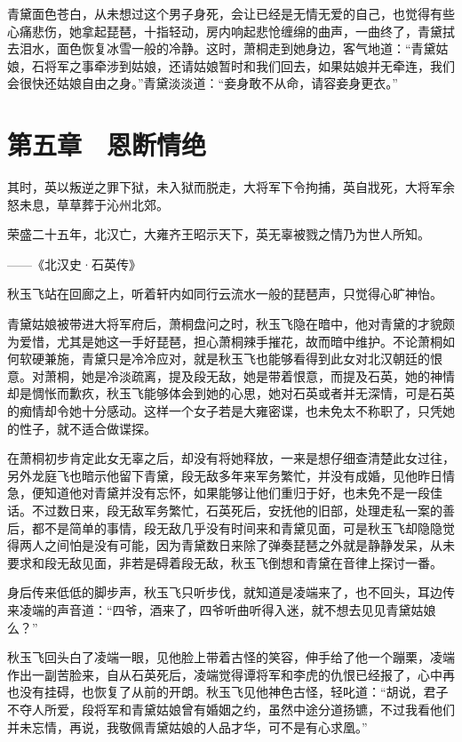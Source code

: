 青黛面色苍白，从未想过这个男子身死，会让已经是无情无爱的自己，也觉得有些心痛悲伤，她拿起琵琶，十指轻动，房内响起悲怆缠绵的曲声，一曲终了，青黛拭去泪水，面色恢复冰雪一般的冷静。这时，萧桐走到她身边，客气地道：“青黛姑娘，石将军之事牵涉到姑娘，还请姑娘暂时和我们回去，如果姑娘并无牵连，我们会很快还姑娘自由之身。”青黛淡淡道：“妾身敢不从命，请容妾身更衣。”

\chapter{第五章　恩断情绝}

其时，英以叛逆之罪下狱，未入狱而脱走，大将军下令拘捕，英自戕死，大将军余怒未息，草草葬于沁州北郊。

荣盛二十五年，北汉亡，大雍齐王昭示天下，英无辜被戮之情乃为世人所知。

——《北汉史·石英传》

秋玉飞站在回廊之上，听着轩内如同行云流水一般的琵琶声，只觉得心旷神怡。

青黛姑娘被带进大将军府后，萧桐盘问之时，秋玉飞隐在暗中，他对青黛的才貌颇为爱惜，尤其是她这一手好琵琶，担心萧桐辣手摧花，故而暗中维护。不论萧桐如何软硬兼施，青黛只是冷冷应对，就是秋玉飞也能够看得到此女对北汉朝廷的恨意。对萧桐，她是冷淡疏离，提及段无敌，她是带着恨意，而提及石英，她的神情却是惆怅而歉疚，秋玉飞能够体会到她的心思，她对石英或者并无深情，可是石英的痴情却令她十分感动。这样一个女子若是大雍密谍，也未免太不称职了，只凭她的性子，就不适合做谍探。

在萧桐初步肯定此女无辜之后，却没有将她释放，一来是想仔细查清楚此女过往，另外龙庭飞也暗示他留下青黛，段无敌多年来军务繁忙，并没有成婚，见他昨日情急，便知道他对青黛并没有忘怀，如果能够让他们重归于好，也未免不是一段佳话。不过数日来，段无敌军务繁忙，石英死后，安抚他的旧部，处理走私一案的善后，都不是简单的事情，段无敌几乎没有时间来和青黛见面，可是秋玉飞却隐隐觉得两人之间怕是没有可能，因为青黛数日来除了弹奏琵琶之外就是静静发呆，从未要求和段无敌见面，非若是碍着段无敌，秋玉飞倒想和青黛在音律上探讨一番。

身后传来低低的脚步声，秋玉飞只听步伐，就知道是凌端来了，也不回头，耳边传来凌端的声音道：“四爷，酒来了，四爷听曲听得入迷，就不想去见见青黛姑娘么？”

秋玉飞回头白了凌端一眼，见他脸上带着古怪的笑容，伸手给了他一个蹦栗，凌端作出一副苦脸来，自从石英死后，凌端觉得谭将军和李虎的仇恨已经报了，心中再也没有挂碍，也恢复了从前的开朗。秋玉飞见他神色古怪，轻叱道：“胡说，君子不夺人所爱，段将军和青黛姑娘曾有婚姻之约，虽然中途分道扬镳，不过我看他们并未忘情，再说，我敬佩青黛姑娘的人品才华，可不是有心求凰。”

